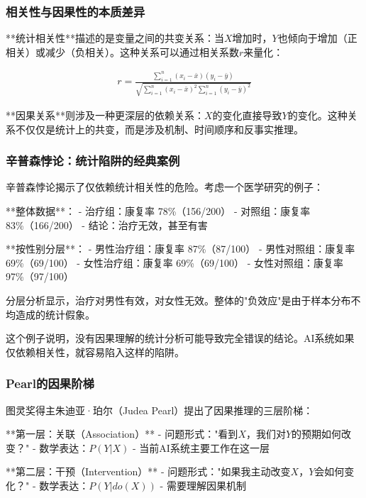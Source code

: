 \subsubsection{相关性与因果性的本质差异}

**统计相关性**描述的是变量之间的共变关系：当$X$增加时，$Y$也倾向于增加（正相关）或减少（负相关）。这种关系可以通过相关系数$r$来量化：

\begin{align}
r = \frac{\sum_{i=1}^{n}(x_i - \bar{x})(y_i - \bar{y})}{\sqrt{\sum_{i=1}^{n}(x_i - \bar{x})^2 \sum_{i=1}^{n}(y_i - \bar{y})^2}}
\end{align}

**因果关系**则涉及一种更深层的依赖关系：$X$的变化直接导致$Y$的变化。这种关系不仅仅是统计上的共变，而是涉及机制、时间顺序和反事实推理。

\subsubsection{辛普森悖论：统计陷阱的经典案例}

辛普森悖论揭示了仅依赖统计相关性的危险。考虑一个医学研究的例子：

**整体数据**：
- 治疗组：康复率 78\%（156/200）
- 对照组：康复率 83\%（166/200）
- 结论：治疗无效，甚至有害

**按性别分层**：
- 男性治疗组：康复率 87\%（87/100）
- 男性对照组：康复率 69\%（69/100）
- 女性治疗组：康复率 69\%（69/100）
- 女性对照组：康复率 97\%（97/100）

分层分析显示，治疗对男性有效，对女性无效。整体的"负效应"是由于样本分布不均造成的统计假象。

\begin{center}
这个例子说明，没有因果理解的统计分析可能导致完全错误的结论。AI系统如果仅依赖相关性，就容易陷入这样的陷阱。
\end{center}

\subsubsection{Pearl的因果阶梯}

图灵奖得主朱迪亚·珀尔（Judea Pearl）提出了因果推理的三层阶梯：

**第一层：关联（Association）**
- 问题形式："看到$X$，我们对$Y$的预期如何改变？"
- 数学表达：$P(Y|X)$
- 当前AI系统主要工作在这一层

**第二层：干预（Intervention）**
- 问题形式："如果我主动改变$X$，$Y$会如何变化？"
- 数学表达：$P(Y|do(X))$
- 需要理解因果机制

